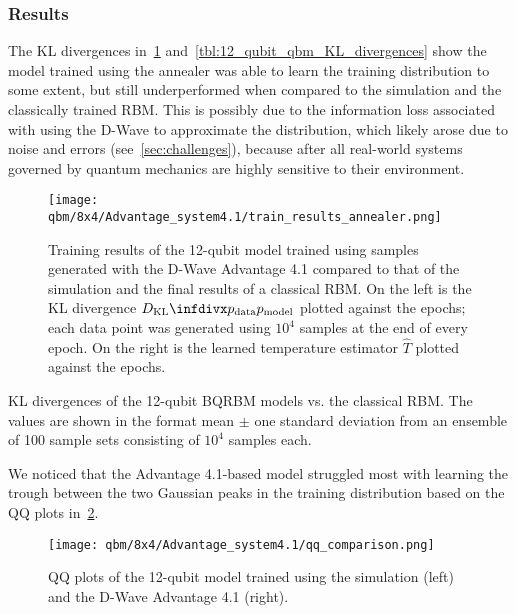 \subsubsection{Results}\label{sec:qbm_annealer_results}
The KL divergences in~\cref{fig:train_results_annealer} and~\cref{tbl:12_qubit_qbm_KL_divergences} show the model trained using the annealer was able to learn the training distribution to some extent, but still underperformed when compared to the simulation and the classically trained RBM.
This is possibly due to the information loss associated with using the D-Wave to approximate the distribution, which likely arose due to noise and errors (see~\cref{sec:challenges}), because after all real-world systems governed by quantum mechanics are highly sensitive to their environment.
\begin{figure}[!htb]
    \begin{center}
        \texttt{[image: qbm/8x4/Advantage\_system4.1/train\_results\_annealer.png]}
    \end{center}
    \caption{
        Training results of the 12-qubit model trained using samples generated with the D-Wave Advantage 4.1 compared to that of the simulation and the final results of a classical RBM.
        On the left is the KL divergence \( \DKL{\pdata}{\pmodel} \) plotted against the epochs; each data point was generated using \( 10^4 \) samples at the end of every epoch.
        On the right is the learned temperature estimator \( \hat{T} \) plotted against the epochs.
    }
    \label{fig:train_results_annealer}
\end{figure}

\begin{table}[!htb]
    \centering
    \begin{adjustbox}{max width=\textwidth}
        
    \end{adjustbox}
    \caption{
        KL divergences of the 12-qubit BQRBM models vs. the classical RBM.
        The values are shown in the format mean \(\pm\) one standard deviation from an ensemble of 100 sample sets consisting of \( 10^4 \) samples each.
}
    \label{tbl:12_qubit_qbm_KL_divergences}
\end{table}

We noticed that the Advantage 4.1-based model struggled most with learning the trough between the two Gaussian peaks in the training distribution based on the QQ plots in~\cref{fig:qq_comparison}.
\begin{figure}[!htb]
    \begin{center}
        \texttt{[image: qbm/8x4/Advantage\_system4.1/qq\_comparison.png]}
    \end{center}
    \caption{QQ plots of the 12-qubit model trained using the simulation (left) and the D-Wave Advantage 4.1 (right).}
    \label{fig:qq_comparison}
\end{figure}

